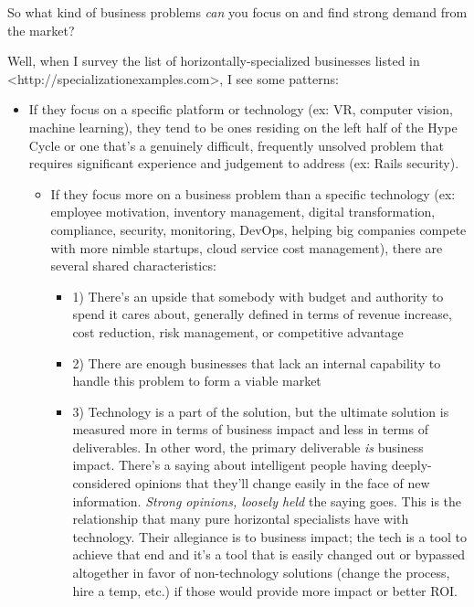 So what kind of business problems \emph{can} you focus on and find strong demand from the market?

Well, when I survey the list of horizontally-specialized businesses listed in \textless{}http://specializationexamples.com\textgreater{}, I see some patterns:

\begin{itemize}
\item If they focus on a specific platform or technology (ex: VR, computer vision, machine learning), they tend to be ones residing on the left half of the Hype Cycle or one that's a genuinely difficult, frequently unsolved problem that requires significant experience and judgement to address (ex: Rails security).


\begin{itemize}
\item If they focus more on a business problem than a specific technology (ex: employee motivation, inventory management, digital transformation, compliance, security, monitoring, DevOps, helping big companies compete with more nimble startups, cloud service cost management), there are several shared characteristics:


\begin{itemize}
\item 1) There's an upside that somebody with budget and authority to spend it cares about, generally defined in terms of revenue increase, cost reduction, risk management, or competitive advantage
\item 2) There are enough businesses that lack an internal capability to handle this problem to form a viable market
\item 3) Technology is a part of the solution, but the ultimate solution is measured more in terms of business impact and less in terms of deliverables. In other word, the primary deliverable \emph{is} business impact. There's a saying about intelligent people having deeply-considered opinions that they'll change easily in the face of new information. \emph{Strong opinions, loosely held} the saying goes. This is the relationship that many pure horizontal specialists have with technology. Their allegiance is to business impact; the tech is a tool to achieve that end and it's a tool that is easily changed out or bypassed altogether in favor of non-technology solutions (change the process, hire a temp, etc.) if those would provide more impact or better ROI.
\end{itemize}
\end{itemize}
\end{itemize}

